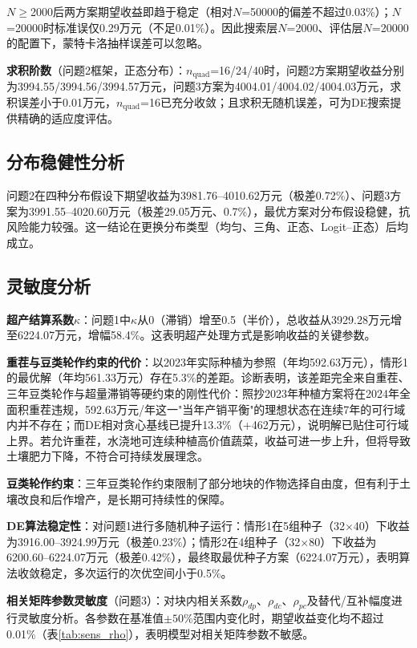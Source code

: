 \documentclass[12pt,a4paper]{article}
\begin{document}
$N\ge$2000后两方案期望收益即趋于稳定（相对$N$=50000的偏差不超过0.03\%）；$N$=20000时标准误仅0.29万元（不足0.01\%）。因此搜索层$N$=2000、评估层$N$=20000的配置下，蒙特卡洛抽样误差可以忽略。

\textbf{求积阶数}（问题2框架，正态分布）：$n_{\mathrm{quad}}$=16/24/40时，问题2方案期望收益分别为3994.55/3994.56/3994.57万元，问题3方案为4004.01/4004.02/4004.03万元，求积误差小于0.01万元，$n_{\mathrm{quad}}$=16已充分收敛；且求积无随机误差，可为DE搜索提供精确的适应度评估。

\subsection{分布稳健性分析}

问题2在四种分布假设下期望收益为3981.76--4010.62万元（极差0.72\%）、问题3方案为3991.55--4020.60万元（极差29.05万元、0.7\%），最优方案对分布假设稳健，抗风险能力较强。这一结论在更换分布类型（均匀、三角、正态、Logit--正态）后均成立。

\subsection{灵敏度分析}

\textbf{超产结算系数$\kappa$}：问题1中$\kappa$从0（滞销）增至0.5（半价），总收益从3929.28万元增至6224.07万元，增幅58.4\%。这表明超产处理方式是影响收益的关键参数。

\textbf{重茬与豆类轮作约束的代价}：以2023年实际种植为参照（年均592.63万元），情形1的最优解（年均561.33万元）存在5.3\%的差距。诊断表明，该差距完全来自重茬、三年豆类轮作与超量滞销等硬约束的刚性代价：照抄2023年种植方案将在2024年全面积重茬违规，592.63万元/年这一"当年产销平衡"的理想状态在连续7年的可行域内并不存在；而DE相对贪心基线已提升13.3\%（+462万元），说明解已贴住可行域上界。若允许重茬，水浇地可连续种植高价值蔬菜，收益可进一步上升，但将导致土壤肥力下降，不符合可持续发展理念。

\textbf{豆类轮作约束}：三年豆类轮作约束限制了部分地块的作物选择自由度，但有利于土壤改良和后作增产，是长期可持续性的保障。

\textbf{DE算法稳定性}：对问题1进行多随机种子运行：情形1在5组种子（32$\times$40）下收益为3916.00--3924.99万元（极差0.23\%）；情形2在4组种子（32$\times$80）下收益为6200.60--6224.07万元（极差0.42\%），最终取最优种子方案（6224.07万元），表明算法收敛稳定，多次运行的次优空间小于0.5\%。

\textbf{相关矩阵参数灵敏度}（问题3）：对块内相关系数$\rho_{dp}$、$\rho_{dc}$、$\rho_{pc}$及替代/互补幅度进行灵敏度分析。各参数在基准值$\pm50\%$范围内变化时，期望收益变化均不超过0.01\%（表\ref{tab:sens_rho}），表明模型对相关矩阵参数不敏感。
\end{document}
